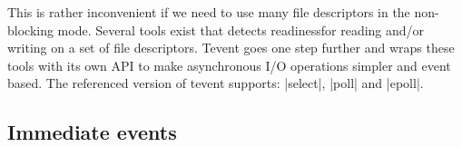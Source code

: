 This is rather inconvenient if we need to use many file descriptors in the
non-blocking mode. Several tools exist that detects readiness\footnotemark for
reading and/or writing on a set of file descriptors. Tevent goes one step
further and wraps these tools with its own API to make asynchronous I/O
operations simpler and event based. The referenced version of tevent supports:
|select|, |poll| and |epoll|.


\subsection{Immediate events}